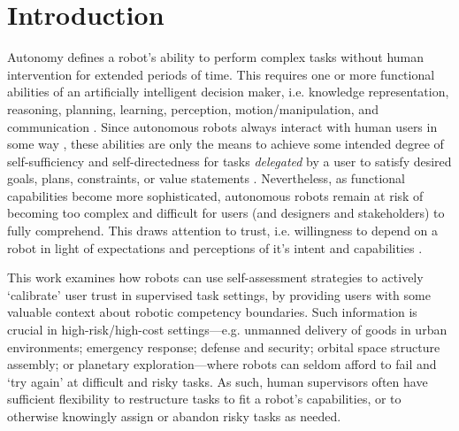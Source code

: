 \section{Introduction}


Autonomy defines a robot's %
ability to perform complex tasks without human intervention for extended periods of time. This requires one or more functional abilities of an artificially intelligent decision maker, i.e. knowledge representation, reasoning, planning, learning, perception, motion/manipulation, and communication \cite{Russell2010-wv}. 
Since autonomous robots always interact with human users in some way \cite{Bradshaw2013-ck}, these abilities are only the means to achieve some intended degree of self-sufficiency and self-directedness for tasks \emph{delegated} by a user to satisfy desired goals, plans, constraints, or value statements \cite{Miller2014-av}. Nevertheless, as functional capabilities become more sophisticated, autonomous robots remain at risk of becoming too complex and difficult for users (and designers and stakeholders) to fully comprehend.  
This draws attention to trust, i.e. willingness to depend on a robot in light of expectations and perceptions of it's intent and capabilities \cite{Israelsen2019-to}. 

This work examines how robots can use self-assessment strategies to actively `calibrate' user trust in supervised task settings, by providing users with some valuable context about robotic competency boundaries. %
Such information is crucial in high-risk/high-cost settings---e.g. unmanned delivery of goods in urban environments; emergency response; defense and security; orbital space structure assembly; or planetary exploration---where robots can seldom afford to fail and `try again' at difficult and risky tasks. %
As such, human supervisors often have sufficient flexibility to restructure tasks to fit a robot's capabilities, or to otherwise knowingly assign or abandon risky tasks as needed. 

